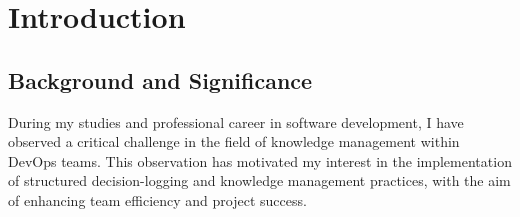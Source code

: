 



\chapter{Introduction} %
\label{Chapter1} %


\newcommand{\keyword}[1]{\textbf{#1}}
\newcommand{\tabhead}[1]{\textbf{#1}}
\newcommand{\code}[1]{\texttt{#1}}
\newcommand{\file}[1]{\texttt{\bfseries#1}}
\newcommand{\option}[1]{\texttt{\itshape#1}}





\section{Background and Significance}

During my studies and professional career in software development, I have observed a critical challenge in the field of knowledge management within DevOps teams. This observation has motivated my interest in the implementation of structured decision-logging and knowledge management practices, with the aim of enhancing team efficiency and project success.

